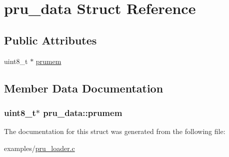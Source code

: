 \hypertarget{structpru__data}{\section{pru\-\_\-data Struct Reference}
\label{structpru__data}
}
\subsection*{Public Attributes}
\begin{DoxyCompactItemize}
\item 
uint8\-\_\-t $\ast$ \hyperlink{structpru__data_a29e00509c51ee8e22747b609333dfe1c}{prumem}
\end{DoxyCompactItemize}


\subsection{Member Data Documentation}
\hypertarget{structpru__data_a29e00509c51ee8e22747b609333dfe1c}{
\subsubsection[{prumem}]{\setlength{\rightskip}{0pt plus 5cm}uint8\-\_\-t$\ast$ pru\-\_\-data\-::prumem}}\label{structpru__data_a29e00509c51ee8e22747b609333dfe1c}


The documentation for this struct was generated from the following file\-:\begin{DoxyCompactItemize}
\item 
examples/\hyperlink{pru__loader_8c}{pru\-\_\-loader.\-c}\end{DoxyCompactItemize}
